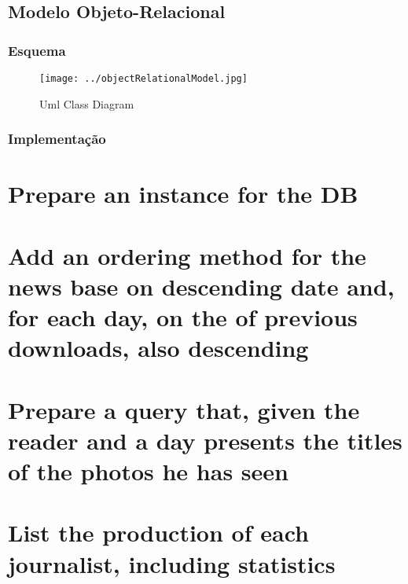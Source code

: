 \documentclass[a4paper,11pt]{article}
\begin{document}
\subsection{Modelo Objeto-Relacional}

\subsubsection{Esquema}
\begin{figure}[H]
	\centering
    	\texttt{[image: ../objectRelationalModel.jpg]}
    \caption{Uml Class Diagram}
\end{figure}

\subsubsection{Implementação}


\section{Prepare an instance for the DB}


\section{Add an ordering method for the news base on descending date and, for each day, on the of previous downloads, also descending}

\section{Prepare a query that, given the reader and a day presents the titles of the photos he has seen}


\section{List the production of each journalist, including statistics}
\end{document}

